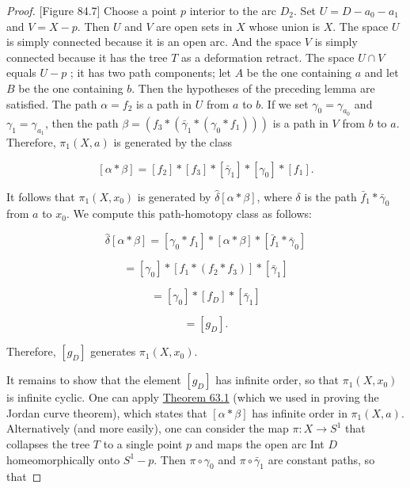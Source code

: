 \begin{proof}
[Figure 84.7]
Choose a point \(p\) interior to the arc \(D_{2}\). Set \(U = D - a_{0} - a_{1}\) and \(V = X - p\). Then \(U\) and \(V\) are open sets in \(X\) whose union is \(X\). The space \(U\) is simply connected because it is an open arc. And the space \(V\) is simply connected because it has the tree \(T\) as a deformation retract. The space \(U \cap V\) equals \(U - p\) ; it has two path components; let \(A\) be the one containing \(a\) and let \(B\) be the one containing \(b\). Then the hypotheses of the preceding lemma are satisfied. The path \(\alpha = f_{2}\) is a path in \(U\) from \(a\) to \(b\). If we set \({\gamma }_{0} = {\gamma }_{a_{0}}\) and \({\gamma }_{1} = {\gamma }_{a_{1}}\), then the path \(\beta = ( {f_{3} * ( {\bar{\gamma }_{1} * ( {{\gamma }_{0} * f_{1}}) }) })\) is a path in \(V\) from \(b\) to \(a\). Therefore, \({\pi }_{1}( {X,a})\) is generated by the class

\[
[ {\alpha * \beta }] = [ f_{2}] * [ f_{3}] * [ \bar{\gamma }_{1}] * [ {\gamma }_{0}] * [ f_{1}] .
\]

It follows that \({\pi }_{1}( {X,x_{0}})\) is generated by \(\hat{\delta }[ {\alpha * \beta }]\), where \(\delta\) is the path \(\bar{f}_{1} * \bar{\gamma }_{0}\) from \(a\) to \(x_{0}\). We compute this path-homotopy class as follows:

\[
\hat{\delta }[ {\alpha * \beta }] = [ {{\gamma }_{0} * f_{1}}] * [ {\alpha * \beta }] * [ {\bar{f}_{1} * \bar{\gamma }_{0}}]
\]

\[
= [ {\gamma }_{0}] * [ {f_{1} * ( {f_{2} * f_{3}}) }] * [ \bar{\gamma }_{1}]
\]

\[
= [ {\gamma }_{0}] * [ f_{D}] * [ \bar{\gamma }_{1}]
\]

\[
= [ g_{D}] \text{.}
\]

Therefore, \([ g_{D}]\) generates \({\pi }_{1}( {X,x_{0}})\).

It remains to show that the element \([ g_{D}]\) has infinite order, so that \({\pi }_{1}( {X,x_{0}})\) is infinite cyclic. One can apply \hyperref[thm:63.1]{Theorem 63.1} (which we used in proving the Jordan curve theorem), which states that \([ {\alpha * \beta }]\) has infinite order in \({\pi }_{1}( {X,a})\). Alternatively (and more easily), one can consider the map \(\pi : X \rightarrow {S}^{1}\) that collapses the tree \(T\) to a single point \(p\) and maps the open arc Int \(D\) homeomorphically onto \(S^{1} - p\). Then \(\pi \circ {\gamma }_{0}\) and \(\pi \circ {\bar{\gamma }}_{1}\) are constant paths, so that


\end{proof}
